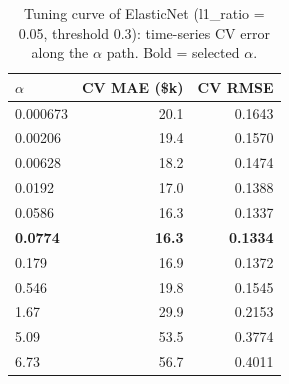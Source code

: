 \begin{table}[t]
\centering
\small
\begin{tabular}{lrr}
\toprule
$\alpha$ & CV MAE (\$k) & CV RMSE \\
\midrule
0.000673 & 20.1 & 0.1643 \\
0.00206 & 19.4 & 0.1570 \\
0.00628 & 18.2 & 0.1474 \\
0.0192 & 17.0 & 0.1388 \\
0.0586 & 16.3 & 0.1337 \\
\textbf{0.0774} & \textbf{16.3} & \textbf{0.1334} \\
0.179 & 16.9 & 0.1372 \\
0.546 & 19.8 & 0.1545 \\
1.67 & 29.9 & 0.2153 \\
5.09 & 53.5 & 0.3774 \\
6.73 & 56.7 & 0.4011 \\
\bottomrule
\end{tabular}
\caption{Tuning curve of ElasticNet (l1\_ratio = 0.05, threshold 0.3): time-series CV error along the $\alpha$ path. Bold = selected $\alpha$.}
\label{tab:tuning_curve}
\end{table}
